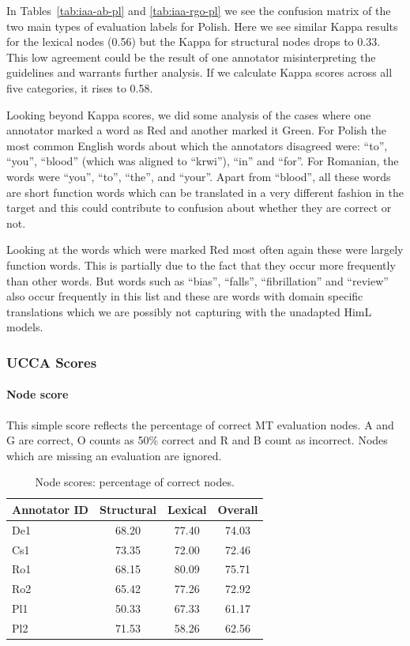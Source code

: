 \documentclass[11pt]{article}
\begin{document}
In Tables~\ref{tab:iaa-ab-pl} and \ref{tab:iaa-rgo-pl} we see the confusion matrix of
the two main types of evaluation labels for Polish. Here we see similar Kappa results for
the lexical nodes (0.56) but the Kappa for structural nodes drops to 0.33. 
This low agreement could be the result of one annotator misinterpreting the guidelines
and warrants further analysis.
If we calculate Kappa scores across all five categories, it rises to 
0.58. 

Looking beyond Kappa scores, we did some analysis of the cases where
one annotator marked a word as Red and another marked it Green. 
For Polish  the most common English words about which the annotators
disagreed were: ``to'', ``you'', ``blood'' (which was aligned to ``krwi''), ``in'' and ``for''. 
For Romanian, the words were ``you'', ``to'', ``the'', and ``your''. 
Apart from ``blood'', all these words are short function words which can 
be translated in a very different fashion in the target and this could contribute to
 confusion about
whether they are correct or not.

Looking at the words which were marked Red most often again these were largely function words.
This is partially due to the fact that they occur more frequently than other words. But
words such as ``bias'', ``falls'', ``fibrillation'' and ``review'' also occur frequently in this list and these
are words with domain specific translations which we are possibly not capturing with
the unadapted HimL models.

\subsubsection{UCCA Scores}

\paragraph{Node score} This simple score reflects the percentage of correct MT evaluation nodes. 
A and G are correct, O counts as 50\% correct and R and B count as incorrect. Nodes which are missing an
evaluation are ignored.

\begin{table}[h!]
\begin{center}
      \begin{tabular}{|l|c|c|c|}
      \hline
\bf{Annotator ID}  & \bf{Structural } & \bf{Lexical } & \bf{Overall }\\
\hline                               
    De1  &  68.20 & 77.40 & 74.03 \\ 
    Cs1  & 73.35 & 72.00 & 72.46 \\ 
    Ro1  & 68.15 & 80.09 & 75.71 \\ 
    Ro2  & 65.42 & 77.26  & 72.92 \\ 
    Pl1  & 50.33 & 67.33 & 61.17 \\ 
    Pl2  & 71.53 &58.26  & 62.56 \\ 
      \hline
    \end{tabular}
\end{center}
\normalsize
\vspace*{-3ex}
\caption{Node scores: percentage of correct nodes. 
}
\label{tab:node_scores}
\end{table}
\end{document}
